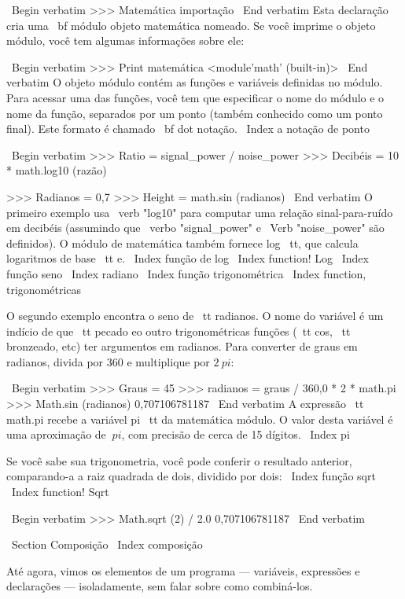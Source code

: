 \documentclass[10pt]{book}
\begin{document}
{\ Begin {verbatim}
>>> Matemática importação
\ End {verbatim}
%
Esta declaração cria uma {\ bf módulo objeto} matemática nomeado. Se
você imprime o objeto módulo, você tem algumas informações sobre ele:

\ Begin {verbatim}
>>> Print matemática
<module'math' (built-in)>
\ End {verbatim}
%
O objeto módulo contém as funções e variáveis ​​definidas no
módulo. Para acessar uma das funções, você tem que especificar o nome
do módulo e o nome da função, separados por um ponto (também
conhecido como um ponto final). Este formato é chamado {\ bf dot notação}.
\ Index {} a notação de ponto

\ Begin {verbatim}
>>> Ratio = signal_power / noise_power
>>> Decibéis = 10 * math.log10 (razão)

>>> Radianos = 0,7
>>> Height = math.sin (radianos)
\ End {verbatim}
%
O primeiro exemplo usa \ verb "log10" para computar 
uma relação sinal-para-ruído em decibéis (assumindo que \ verbo "signal_power" e
\ Verb "noise_power" são definidos). O módulo de matemática também fornece {log \ tt},
que calcula logaritmos de base {\ tt e}.
\ Index {função de log}
\ Index {function! Log}
\ Index {função seno}
\ Index {} radiano
\ Index {função trigonométrica}
\ Index {function, trigonométricas}

O segundo exemplo encontra o seno de {\ tt radianos}. O nome do
variável é um indício de que {\ tt pecado} eo outro trigonométricas
funções ({\ tt cos}, {\ tt bronzeado}, etc) ter argumentos em radianos. Para
converter de graus em radianos, divida por 360 e multiplique por
$ 2 \ pi $:

\ Begin {verbatim}
>>> Graus = 45
>>> radianos = graus / 360,0 * 2 * math.pi
>>> Math.sin (radianos)
0,707106781187
\ End {verbatim}
%
A expressão {\ tt math.pi} recebe a variável {pi \ tt} da matemática
módulo. O valor desta variável é uma aproximação
de $ \ pi $, com precisão de cerca de 15 dígitos.
\ Index {pi}

Se você sabe
sua trigonometria, você pode conferir o resultado anterior, comparando-a
a raiz quadrada de dois, dividido por dois:
\ Index {função sqrt}
\ Index {function! Sqrt}

\ Begin {verbatim}
>>> Math.sqrt (2) / 2.0
0,707106781187
\ End {verbatim}
%

\ Section {Composição}
\ Index {composição}

Até agora, vimos os elementos de um programa --- variáveis,
expressões e declarações --- isoladamente, sem falar sobre como
combiná-los.

}
\end{document}
